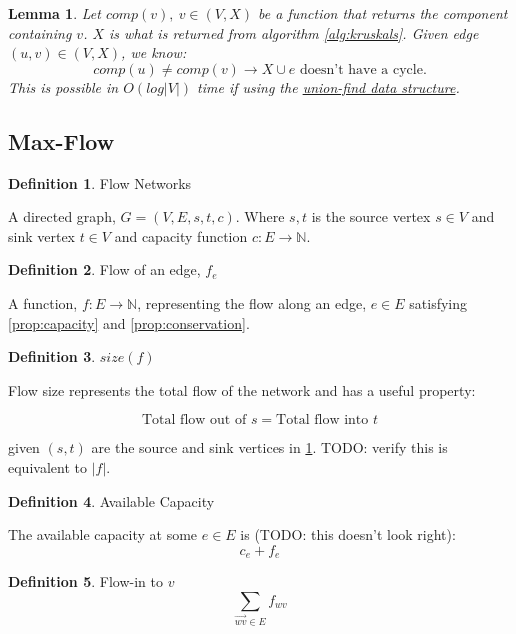 \documentclass{article}
\newtheorem{lemma}[theorem]{Lemma}
\theoremstyle{definition}
\newtheorem{definition}{Definition}[section]
\begin{document}
\begin{lemma}
	Let $comp(v), \: v \in (V,X)$ be a function that returns the component containing $v$. $X$ is what is returned from algorithm \ref{alg:kruskals}. Given edge $(u,v) \in (V,X)$, we know:
	$$comp(u) \neq comp(v) \to X \cup e \text{ doesn't have a cycle.}$$
	This is possible in $O(log|V|)$ time if using the \href{https://en.wikipedia.org/wiki/Disjoint-set_data_structure}{union-find data structure}.
\end{lemma}

\subsection{Max-Flow}
\begin{definition}{Flow Networks}
\label{def:flow_networks}

A directed graph, $G = (V, E, s, t, c)$. Where $s, t$ is the source vertex $s \in V$ and sink vertex $t \in V$ and capacity function $c:E \to \mathbb{N}$.
\end{definition}


\begin{definition}{Flow of an edge, $f_e$}
\label{prop:flow_edge}
	
A function, $f:E \to \mathbb{N}$, representing the flow along an edge, $e \in E$ satisfying \ref{prop:capacity} and \ref{prop:conservation}.
\end{definition}

\begin{definition}{$size(f)$}
\label{prop:size}
	
Flow size represents the total flow of the network and has a useful property:
	
$$\text{Total flow out of } s = \text{Total flow into } t$$
	
given $(s, t)$ are the source and sink vertices in \ref{def:flow_networks}. TODO: verify this is equivalent to $|f|$.
\end{definition}

\begin{definition}{Available Capacity}
\label{def:available_cap}

The available capacity at some $e \in E$ is (TODO: this doesn't look right):
$$c_e + f_e$$
\end{definition}

\begin{definition}{Flow-in to $v$}
\label{def:flowin}
$$\sum_{\overrightarrow{wv} \in E}{f_{wv}}$$
\end{definition}
\end{document}
